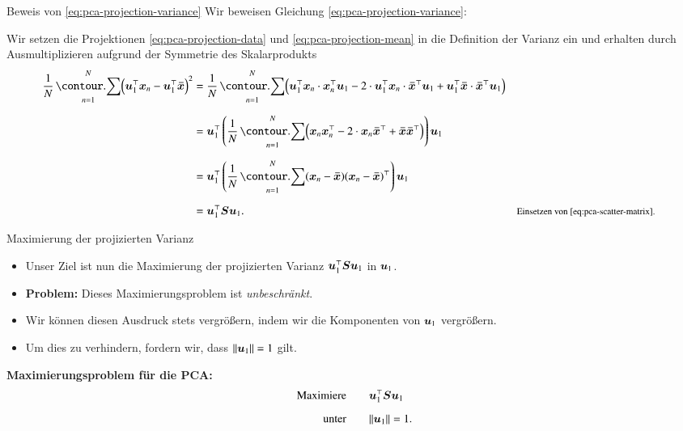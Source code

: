 \begin{frame}{Beweis von \eqref{eq:pca-projection-variance}}{}
	Wir beweisen Gleichung \eqref{eq:pca-projection-variance}: \\ \vspace*{2mm}
	\begin{myproof}
		Wir setzen die Projektionen \eqref{eq:pca-projection-data} und \eqref{eq:pca-projection-mean} in die Definition
		der Varianz ein und erhalten durch Ausmultiplizieren aufgrund der Symmetrie des Skalarprodukts
		\begin{align*}
			\frac{1}{N} \sum_{n=1}^N \Bigl( \bu_1^\top \bx_n - \bu_1^\top \bxmean \Bigr)^2
				&= \frac{1}{N} \sum_{n=1}^N \Bigl(
					\bu_1^\top \bx_n \cdot \bx_n^\top \bu_1 - 2 \cdot \bu_1^\top \bx_n \cdot \bxmean^\top \bu_1
						+ \bu_1^\top \bxmean \cdot \bxmean^\top \bu_1
				\Bigr)
		\\[2mm]
				&= \bu_1^\top \left(
					\frac{1}{N} \sum_{n=1}^N \Bigl( \bx_n \bx_n^\top - 2 \cdot \bx_n \bxmean^\top + \bxmean\bxmean^\top \Bigr)
				\right) \bu_1
		\\[2mm]
				&= \bu_1^\top \left( \frac{1}{N} \sum_{n=1}^N (\bx_n - \bxmean) (\bx_n - \bxmean)^\top \right) \bu_1
		\\[2mm]
				&= \bu_1^\top \bS \bu_1.
				&& \rem{Einsetzen von \eqref{eq:pca-scatter-matrix}.}
		\end{align*}
	\end{myproof}
\end{frame}


\begin{frame}{Maximierung der projizierten Varianz}{}
	\begin{itemize}
		\item Unser Ziel ist nun die Maximierung der projizierten Varianz $\bm{u}_1^\top \bm{S} \bm{u}_1$ in $\bm{u}_1$.
		\item \textbf{Problem:} Dieses Maximierungsproblem ist \textit{unbeschränkt}.
		\item Wir können diesen Ausdruck stets vergrößern, indem wir die Komponenten von $\bm{u}_1$ vergrößern.
		\item Um dies zu verhindern, fordern wir, dass $\Vert \bm{u}_1 \Vert = 1$ gilt.
	\end{itemize}

	\begin{boxGray}
		\textbf{Maximierungsproblem für die PCA:}
		\begin{equation} \label{eq:pca-max-var-problem}
			\begin{aligned}
				\text{Maximiere} 	&\qquad \bm{u}_1^\top \bm{S} \bm{u}_1
			\\[2mm]
				\text{unter} 		&\qquad \Vert \bm{u}_1 \Vert = 1.
			\end{aligned}
		\end{equation}
	\end{boxGray}
\end{frame}


